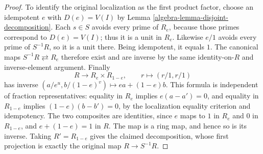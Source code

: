 \begin{proof}
\medskip\noindent
To identify the original localization as the first product factor,
choose an idempotent $e$ with $D(e)=V(I)$ by
Lemma \ref{algebra-lemma-disjoint-decomposition}. Each $s\in S$ avoids every
prime of $R_e$, because those primes correspond to $D(e)=V(I)$;
thus it is a unit in $R_e$. Likewise $e/1$ avoids every prime of
$S^{-1}R$, so it is a unit there. Being idempotent, it equals $1$.
The canonical maps $S^{-1}R\rightleftarrows R_e$ therefore exist and
are inverse by the same identity-on-$R$ and inverse-element argument.
Finally
$$
R\longrightarrow R_e\times R_{1-e},\qquad
r\longmapsto(r/1,r/1)
$$
has inverse $(a/e^u,b/(1-e)^v)\longmapsto ea+(1-e)b$.
This formula is independent of fraction representatives: equality
in $R_e$ implies $e(a-a')=0$, and equality in $R_{1-e}$ implies
$(1-e)(b-b')=0$, by the localization equality criterion and
idempotency. The two composites are identities, since $e$ maps to
$1$ in $R_e$ and $0$ in $R_{1-e}$, and $e+(1-e)=1$ in $R$.
The map is a ring map, and hence so is its inverse. Taking
$R'=R_{1-e}$ gives the claimed decomposition, whose first projection
is exactly the original map $R\to S^{-1}R$.
\end{proof}
